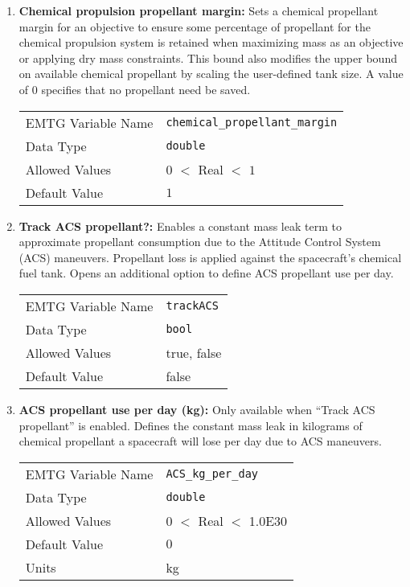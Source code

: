 \begin{enumerate}
    \item \textbf{Chemical propulsion propellant margin:} Sets a chemical propellant margin for an objective to ensure some percentage of propellant for the chemical propulsion system is retained when maximizing mass as an objective or applying dry mass constraints. This bound also modifies the upper bound on available chemical propellant by scaling the user-defined tank size. A value of 0 specifies that no propellant need be saved.
    \begin{table}[H]
        \hspace{2cm}
        \begin{tabular}{lp{5cm}}
        \ac{EMTG} Variable Name & \verb|chemical_propellant_margin| \\
        Data Type & \verb|double| \\
        Allowed Values & $0$ $<$ Real $<$ $1$ \\
        Default Value & $1$ \\
        \end{tabular}
    \end{table}
    
    \item \textbf{Track ACS propellant?:} Enables a constant mass leak term to approximate propellant consumption due to the Attitude Control System (ACS) maneuvers. Propellant loss is applied against the spacecraft's chemical fuel tank. Opens an additional option to define ACS propellant use per day.
    \begin{table}[H]
        \hspace{2cm}
        \begin{tabular}{lp{5cm}}
        \ac{EMTG} Variable Name & \verb|trackACS| \\
        Data Type & \verb|bool| \\
        Allowed Values & true, false \\
        Default Value & false \\
        \end{tabular}
    \end{table}
    
    \item \textbf{ACS propellant use per day (kg):} Only available when ``Track ACS propellant'' is enabled. Defines the constant mass leak in kilograms of chemical propellant a spacecraft will lose per day due to ACS maneuvers.
    \begin{table}[H]
        \hspace{2cm}
        \begin{tabular}{lp{5cm}}
        \ac{EMTG} Variable Name & \verb|ACS_kg_per_day| \\
        Data Type & \verb|double| \\
        Allowed Values & $0$ $<$ Real $<$ 1.0E30 \\
        Default Value & $0$ \\
        Units & kg
        \end{tabular}
    \end{table}
    

\end{enumerate}
